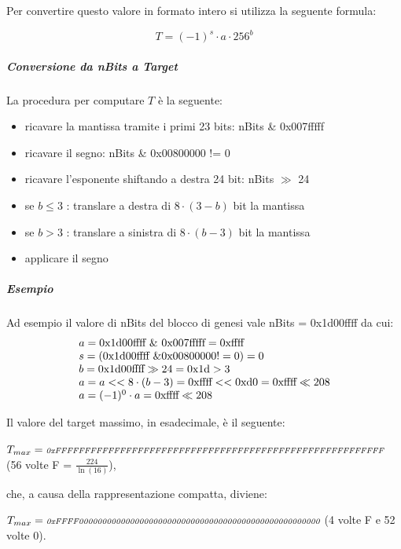 \documentclass{book}
\theoremstyle{definition}
\begin{document}
Per convertire questo valore in formato intero si utilizza la seguente formula:

\begin{equation}
    T = (-1)^{s} \cdot a \cdot 256^{b}
\end{equation}

\subparagraph{Conversione da nBits a Target}

La procedura per computare $T$ è la seguente:

\begin{itemize}
    \item ricavare la mantissa tramite i primi 23 bits: nBits \& 0x007fffff
    \item ricavare il segno: nBits \& 0x00800000 != 0
    \item ricavare l'esponente shiftando a destra 24 bit: nBits $\gg$ 24
    \item se $b \le 3$ : translare a destra di $8 \cdot {(3 - b)}$ bit la mantissa
    \item se $b > 3$ : translare a sinistra di $8 \cdot {(b - 3)}$ bit la mantissa
    \item applicare il segno
\end{itemize}


\subparagraph{Esempio}
Ad esempio il valore di nBits del blocco di genesi vale nBits = 0x1d00ffff da cui:
\begin{equation}
    \begin{array}{ll}
        a = \textnormal{0x1d00ffff} \ \& \ \textnormal{0x007fffff} = \textnormal{0xffff} \\
        s = (\textnormal{0x1d00ffff} \ \& \textnormal{0x00800000} != 0) = 0 \\
        b = \textnormal{0x1d00ffff} \gg 24 = \textnormal{0x1d} > 3\\
        a = a << 8 \cdot (b - 3) = \textnormal{0xffff} << \textnormal{0xd0} = \textnormal{0xffff} \ll 208 \\
        a = (-1)^0 \cdot a =  \textnormal{0xffff} \ll 208
    \end{array}
\end{equation}

Il valore del target massimo, in esadecimale, è il seguente:

$T_{max} = \textit{\scriptsize{0xFFFFFFFFFFFFFFFFFFFFFFFFFFFFFFFFFFFFFFFFFFFFFFFFFFFFFFFF}}$  (56 volte F = $\frac{224}{\ln(16)}$),

che, a causa della rappresentazione compatta, diviene:

$T_{max} = \textit{\scriptsize{0xFFFF0000000000000000000000000000000000000000000000000000}}$ (4 volte F e 52 volte 0).
\end{document}
